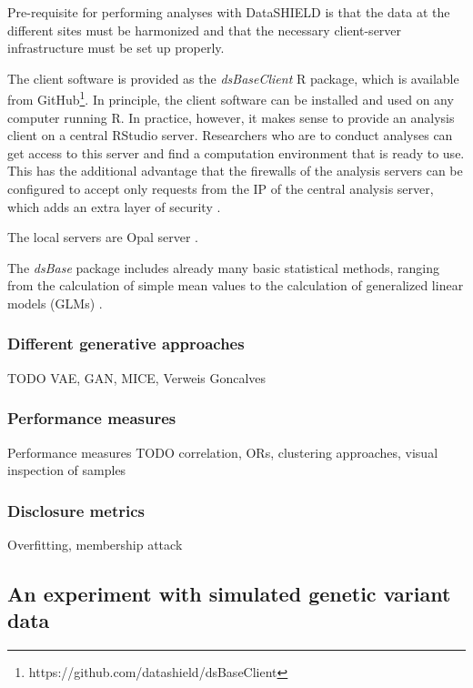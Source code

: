 \documentclass[12pt]{article}
\newcommand{\apkg}[1]{\emph{#1}}
\begin{document}
Pre-requisite for performing analyses with DataSHIELD is that the data at the different sites must be harmonized and that the necessary client-server infrastructure must be set up properly.

The client software is provided as the \apkg{dsBaseClient} R package, which is available from GitHub\footnote{https://github.com/datashield/dsBaseClient}.
In principle, the client software can be installed and used on any computer running R.
In practice, however, it makes sense to provide an analysis client on a central RStudio server.
Researchers who are to conduct analyses can get access to this server and find a computation environment that is ready to use.
This has the additional advantage that the firewalls of the analysis servers can be configured to accept only requests from the IP of the central analysis server, which adds an extra layer of security \citep{gruendner}.

The local servers are Opal server \citep{opal}.

The \apkg{dsBase} package includes already many  basic statistical methods, ranging from the calculation of simple mean values to the calculation of generalized linear models (GLMs) \citep{wolfson_datashield}.






\subsubsection{Different generative approaches}
TODO VAE, GAN, MICE, Verweis Goncalves

\subsubsection{Performance measures}
Performance measures
TODO correlation, ORs, clustering approaches, visual inspection of samples

\subsubsection{Disclosure metrics}
Overfitting, membership attack


\subsection{An experiment with simulated genetic variant data}
\end{document}
